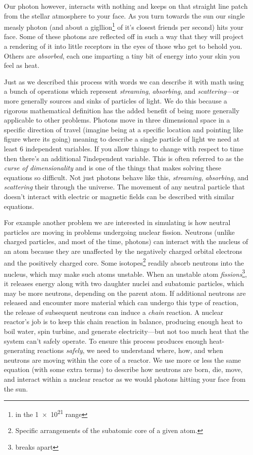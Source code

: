 Our photon however, interacts with nothing and keeps on that straight line patch from the stellar atmosphere to your face.
As you turn towards the sun our single measly photon (and about a gigllion\footnote{in the \num{1e21} range} of it's closest friends per second) hits your face.
Some of these photons are reflected off in such a way that they will project a rendering of it into little receptors in the eyes of those who get to behold you.
Others are \textit{absorbed}, each one imparting a tiny bit of energy into your skin you feel as heat.

Just as we described this process with words we can describe it with math using a bunch of operations which represent \textit{streaming}, \textit{absorbing}, and \textit{scattering}---or more generally sources and sinks of particles of light.
We do this because a rigorous mathematical definition has the added benefit of being more generally applicable to other problems.
Photons move in three dimensional space in a specific direction of travel (imagine being at a specific location and pointing like figure where its going) meaning to describe a single particle of light we need at least 6 independent variables.
If you allow things to change with respect to time then there's an additional 7\ths independent variable.
This is often referred to as the \textit{curse of dimensionality} and is one of the things that makes solving these equations so difficult.
Not just photons behave like this, \textit{streaming}, \textit{absorbing}, and \textit{scattering} their through the universe.
The movement of any neutral particle that doesn't interact with electric or magnetic fields can be described with similar equations.

For example another problem we are interested in simulating is how neutral particles are moving in problems undergoing nuclear fission.
Neutrons (unlike charged particles, and most of the time, photons) can interact with the nucleus of an atom because they are unaffected by the negatively charged orbital electrons and the positively charged core.
Some isotopes\footnote{Specific arrangements of the subatomic core of a given atom.} readily absorb neutrons into the nucleus, which may make such atoms unstable.
When an unstable atom \textit{fissions}\footnote{breaks apart}, it releases energy along with two daughter nuclei and subatomic particles, which may be more neutrons, depending on the parent atom.
If additional neutrons are released and encounter more material which can undergo this type of reaction, the release of subsequent neutrons can induce a \textit{chain} reaction.
A nuclear reactor's job is to keep this chain reaction in balance, producing enough heat to boil water, spin turbine, and generate electricity---but not too much heat that the system can't safely operate.
To ensure this process produces enough heat-generating reactions \textit{safely}, we need to understand where, how, and when neutrons are moving within the core of a reactor.
We use more or less the same equation (with some extra terms) to describe how neutrons are born, die, move, and interact within a nuclear reactor as we would photons hitting your face from the sun.


